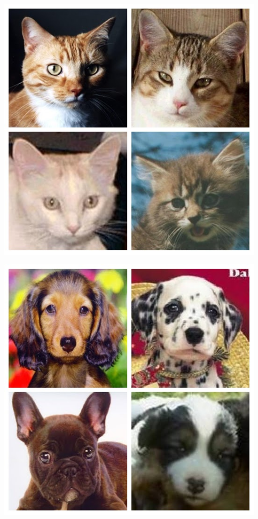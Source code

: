 \documentclass[12pt]{article}
\begin{document}
\begin{minipage}[t]{0.2\textwidth} 
	\includegraphics[width=1\textwidth]{Images/cat.jpg}
\end{minipage}
\begin{minipage}[t]{0.2\textwidth} 
	\includegraphics[width=1\textwidth]{Images/dog.jpg}
\end{minipage}
\end{document}
